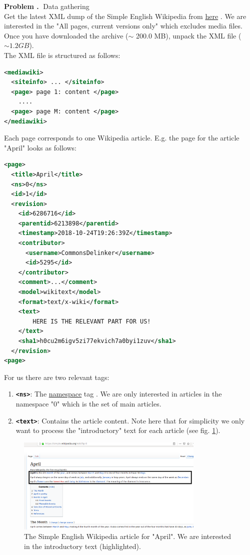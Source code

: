 \documentclass[10pt]{article}
\newcounter{problemCounter}
\newenvironment{problem}[1]
{
	\vspace{0.5cm}
	\refstepcounter{problemCounter}\label{#1}
	\noindent \textbf{Problem \theproblemCounter.$\;$} 
}{}
\begin{document}
\begin{problem}
	DData gathering \\
	Get the latest XML dump of the Simple English Wikipedia from  \href{https://dumps.wikimedia.org/simplewiki/20181120/}{here} \cite{url:sew-dump}. We are interested in the "All pages, current versions only" which excludes media files. Once you have downloaded the archive ($\sim$ 200.0 MB), unpack the XML file ($\sim 1.2 GB$).
\end{problem} \\
The XML file is structured as follows:
\begin{lstlisting}[language=XML]
<mediawiki>
  <siteinfo> ... </siteinfo>
  <page> page 1: content </page>
    ....
  <page> page M: content </page>
</mediawiki>
\end{lstlisting}
Each page corresponds to one Wikipedia article. E.g. the page for the article "April" looks as follows:
\begin{lstlisting}[language=XML]
<page>
  <title>April</title>
  <ns>0</ns>
  <id>1</id>
  <revision>
    <id>6286716</id>
    <parentid>6213898</parentid>
    <timestamp>2018-10-24T19:26:39Z</timestamp>
    <contributor>
      <username>CommonsDelinker</username>
      <id>5295</id>
    </contributor>
    <comment>...</comment>
    <model>wikitext</model>
    <format>text/x-wiki</format>
    <text>
        HERE IS THE RELEVANT PART FOR US!
    </text>
    <sha1>h0cu2m6igv5zi77ekvich7a0byi1zuv</sha1>
  </revision>
<page>
\end{lstlisting}
For us there are two relevant tags:
\begin{enumerate}
  \item \textbf{\texttt{\color{codeGray}<\color{MidnightBlue}ns\color{codeGray}>}}: The \href{https://en.wikipedia.org/wiki/Wikipedia:Namespace}{namespace} tag \cite{url:wiki-ns}. We are only interested in articles in the namespace "$0$" which is the set of main articles.
  \item \textbf{\texttt{\color{codeGray}<\color{MidnightBlue}text\color{codeGray}>}}: Contains the article content. Note here that for simplicity we only want to process the "introductory" text for each article (see fig. \ref{fig:article_intro}).
\end{enumerate}

\begin{figure}
	\center
	\includegraphics[width=0.8\textwidth]{article_intro.png}
	\caption{The Simple English Wikipedia article for "April". We are interested in the introductory text (highlighted).}
	\label{fig:article_intro}
\end{figure}
\end{document}
